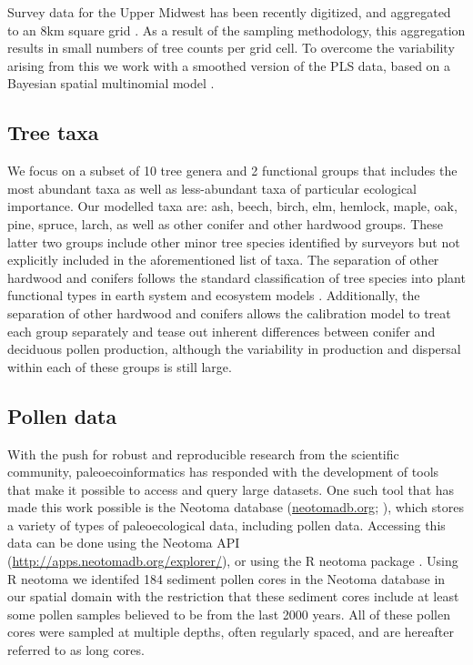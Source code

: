 \documentclass[12pt]{article}
\begin{document}
Survey data for the Upper Midwest has been recently digitized, and
aggregated to an 8km square grid \citep{XXX}. As a result of the
sampling methodology, this aggregation results in small numbers of
tree counts per grid cell. To overcome the variability arising from
this we work with a smoothed version of the PLS data, based on a
Bayesian spatial multinomial model \citep{paciorek_composition}. 

\subsection{Tree taxa}
We focus on a subset of 10 tree genera and 2 functional groups that
includes the most abundant taxa as well as less-abundant taxa of
particular ecological importance. Our modelled taxa are: ash, beech,
birch, elm, hemlock, maple, oak, pine, spruce, larch, as well as other
conifer and other hardwood groups.  These latter two groups include
other minor tree species identified by surveyors but not explicitly
included in the aforementioned list of taxa. The separation of other
hardwood and conifers follows the standard classification of tree
species into plant functional types in earth system and ecosystem
models \citep{cramer2001global, goring2015}. Additionally, the
separation of other hardwood and conifers allows the calibration model
to treat each group separately and tease out inherent differences
between conifer and deciduous pollen production, although the
variability in production and dispersal within each of these groups is
still large.


\subsection{Pollen data}

With the push for robust and reproducible research from the scientific
community, paleoecoinformatics has responded with the development of
tools that make it possible to access and query large datasets. One
such tool that has made this work possible is the Neotoma database
(\url{neotomadb.org}; \citep{XXX}), which stores a variety of types of
paleoecological data, including pollen data. Accessing this data can
be done using the Neotoma API
(\url{http://apps.neotomadb.org/explorer/}), or using the R neotoma
package \citep{goring2015}. Using R neotoma we identifed 184 sediment
pollen cores in the Neotoma database in our spatial domain with the
restriction that these sediment cores include at least some pollen
samples believed to be from the last 2000 years. All of these pollen
cores were sampled at multiple depths, often regularly spaced, and are
hereafter referred to as long cores.
\end{document}
